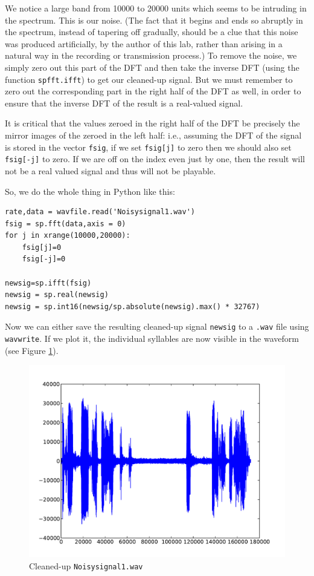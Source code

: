 We notice a large band from 10000 to 20000 units which seems to be intruding in the spectrum. This is our noise. (The fact that it begins and ends so abruptly in the spectrum, instead of tapering off gradually, should be a clue that this noise was produced artificially, by the author of this lab, rather than arising in a natural way in the recording or transmission process.) To remove the noise, we simply zero out this part of the DFT and then take the inverse DFT (using the function \texttt{spfft.ifft}) to get our cleaned-up signal. But we must remember to zero out the corresponding part in the right half of the DFT as well, in order to ensure that the inverse DFT of the result is a real-valued signal.

It is critical that the values zeroed in the right half of the DFT be precisely the mirror images of the zeroed in the left half: i.e., assuming the DFT of the signal is stored in the vector \texttt{fsig}, if we set \texttt{fsig[j]} to zero then we should also set \texttt{fsig[-j]} to zero. If we are off on the index even just by one, then the result will not be a real valued signal and thus will not be playable.

So, we do the whole thing in Python like this:
\begin{lstlisting}
rate,data = wavfile.read('Noisysignal1.wav')
fsig = sp.fft(data,axis = 0)
for j in xrange(10000,20000):
    fsig[j]=0
    fsig[-j]=0

newsig=sp.ifft(fsig)
newsig = sp.real(newsig)
newsig = sp.int16(newsig/sp.absolute(newsig).max() * 32767)
\end{lstlisting}

Now we can either save the resulting cleaned-up signal \texttt{newsig} to a \texttt{.wav} file using \texttt{wavwrite}. If we plot it, the individual syllables are now visible in the waveform (see Figure \ref{cleansignal}).

\begin{figure}[ht]\caption{Cleaned-up \texttt{Noisysignal1.wav} }\label{cleansignal}\centering\includegraphics[width=\textwidth]{Cleanedsignal}\end{figure}

